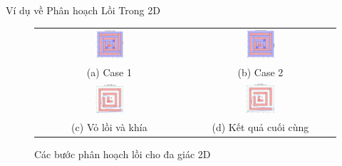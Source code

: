 \documentclass[aspectratio=169]{beamer}
\begin{document}
\begin{frame}{Ví dụ về Phân hoạch Lồi Trong 2D}

    \begin{figure}
        \centering
        \begin{tabular}{cc}
            \includegraphics[width=0.2\textwidth]{../imgs/decompose-env3-1.png} &
            \includegraphics[width=0.2\textwidth]{../imgs/decompose-env3-2.png} \\
            \small (a) Case 1 & \small (b) Case 2 \\[1em]
            \includegraphics[width=0.2\textwidth]{../imgs/bezier-env3-1.png} &
            \includegraphics[width=0.2\textwidth]{../imgs/bezier-env3-2.png} \\
            \small (c) Vỏ lồi và khía & \small (d) Kết quả cuối cùng
        \end{tabular}
        \caption{\small Các bước phân hoạch lồi cho đa giác 2D}
    \end{figure}
        
\end{frame}
\end{document}

